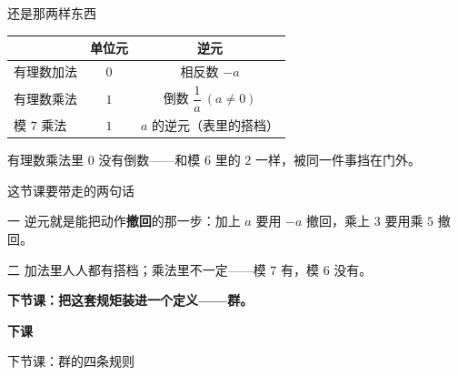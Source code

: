 \documentclass[10pt]{beamer}
\begin{document}
\begin{frame}{还是那两样东西}
  \begin{center}
  \begin{tabular}{@{}lcc@{}}
    \toprule
     & \textbf{单位元} & \textbf{逆元} \\
    \midrule
    有理数加法 & \(0\) & 相反数 \(-a\) \\
    有理数乘法 & \(1\) & 倒数 \(\dfrac1a\ (a\neq0)\) \\
    模 \(7\) 乘法 & \(1\) & \(a\) 的逆元（表里的搭档） \\
    \bottomrule
  \end{tabular}
  \end{center}
  \pause
  \begin{att}
    有理数乘法里 \(0\) 没有倒数——和模 \(6\) 里的 \(2\) 一样，被同一件事挡在门外。
  \end{att}
\end{frame}

\begin{frame}{这节课要带走的两句话}
  \begin{block}{一}
    逆元就是能把动作\textbf{撤回}的那一步：加上 \(a\) 要用 \(-a\) 撤回，乘上 \(3\) 要用乘 \(5\) 撤回。
  \end{block}
  \begin{block}{二}
    加法里人人都有搭档；乘法里不一定——模 \(7\) 有，模 \(6\) 没有。
  \end{block}
  \pause
  \begin{center}
    {\large\textcolor{textgreen}{\bfseries 下节课：把这套规矩装进一个定义——群。}}
  \end{center}
\end{frame}

\begin{frame}
  \begin{center}
    \vspace{1.6cm}
    {\Large\textcolor{textgreen}{\bfseries 下课}}

    \vspace{1.0cm}
    {\large\textcolor{accentgreen}{下节课：群的四条规则}}
  \end{center}
\end{frame}
\end{document}
